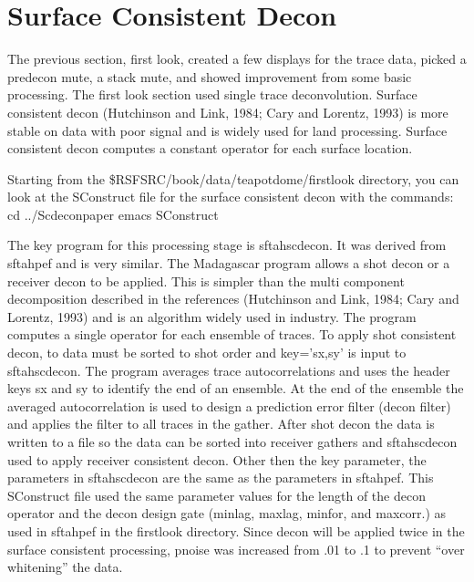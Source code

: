 

\section{Surface Consistent Decon}
The previous section, first look, created a few displays for the trace data, picked a predecon mute, a stack mute, and showed improvement from some basic processing.  The first look section used single trace deconvolution.  Surface consistent decon (Hutchinson and Link, 1984; Cary and Lorentz, 1993) is more stable on data with poor signal and is widely used for land processing.  Surface consistent decon computes a constant operator for each surface location.  

Starting from the \$RSFSRC/book/data/teapotdome/firstlook directory, you can look at the SConstruct file for the surface consistent decon with the commands:
cd ../Scdeconpaper
emacs SConstruct

The key program for this processing stage is sftahscdecon.  It was derived from sftahpef and is very similar.  The Madagascar program allows a shot decon or a receiver decon to be applied.  This is simpler than the multi component decomposition described in the references  (Hutchinson and Link, 1984; Cary and Lorentz, 1993) and is an algorithm widely used in industry.  The program computes a single operator for each ensemble of traces.  To apply shot consistent decon, to data must be sorted to shot order and key=’sx,sy' is input to sftahscdecon.  The program averages trace autocorrelations and uses the header keys sx and sy to identify the end of an ensemble.  At the end of the ensemble the averaged autocorrelation is used to design a prediction error filter (decon filter) and applies the filter to all traces in the gather.  After shot decon the data is written to a file so the data can be sorted into receiver gathers and sftahscdecon used to apply receiver consistent decon.  Other then the key parameter, the parameters in sftahscdecon are the same as the parameters in sftahpef.  This SConstruct file used the same parameter values for the length of the decon operator and the decon design gate (minlag, maxlag, minfor, and maxcorr.) as used in sftahpef in the firstlook directory.  Since decon will be applied twice in the surface consistent processing, pnoise was increased from .01 to .1 to prevent “over whitening”  the data.

